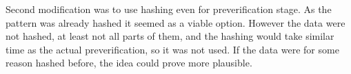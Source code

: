 Second modification was to use hashing even for preverification stage. As the pattern was already hashed it seemed as a viable option. However the data were not hashed, at least not all parts of them, and the hashing would take similar time as the actual preverification, so it was not used. If the data were for some reason hashed before, the idea could prove more plausible.
